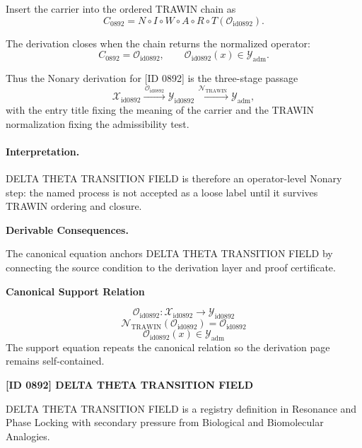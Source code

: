Insert the carrier into the ordered TRAWIN chain as\[
C_{0892}=N\circ I\circ W\circ A\circ R\circ T(\mathcal{O}_{\mathrm{id0892}}).
\]

The derivation closes when the chain returns the normalized operator:\[
C_{0892}=\mathcal{O}_{\mathrm{id0892}},\qquad \mathcal{O}_{\mathrm{id0892}}(x)\in\mathcal{Y}_{\mathrm{adm}}.
\]

Thus the Nonary derivation for [ID 0892] is the three-stage passage
\[
\mathcal{X}_{\mathrm{id0892}}\xrightarrow{\,\mathcal{O}_{\mathrm{id0892}}\,} \mathcal{Y}_{\mathrm{id0892}}\xrightarrow{\,\mathcal{N}_{\mathrm{TRAWIN}}\,} \mathcal{Y}_{\mathrm{adm}},
\]
with the entry title fixing the meaning of the carrier and the TRAWIN normalization fixing the admissibility test.

\paragraph{Interpretation.} DELTA THETA TRANSITION FIELD is therefore an operator-level Nonary step: the named process is not accepted as a loose label until it survives TRAWIN ordering and closure.

\par\vspace{0.35em}
\noindent\textbf{Derivable Consequences.}\quad
\begingroup
\footnotesize
\raggedright
The canonical equation anchors DELTA THETA TRANSITION FIELD by connecting the source condition to the derivation layer and proof certificate.
\par\endgroup

\noindent\textbf{Canonical Support Relation}\par
\[
\mathcal{O}_{\mathrm{id0892}}:\mathcal{X}_{\mathrm{id0892}}\longrightarrow\mathcal{Y}_{\mathrm{id0892}}
\]
\[
\mathcal{N}_{\mathrm{TRAWIN}}(\mathcal{O}_{\mathrm{id0892}})=\mathcal{O}_{\mathrm{id0892}}
\]
\[
\mathcal{O}_{\mathrm{id0892}}(x)\in\mathcal{Y}_{\mathrm{adm}}
\]
\noindent The support equation repeats the canonical relation so the derivation page remains self-contained.\par

\clearpage
\noindent\textbf{[ID 0892] DELTA THETA TRANSITION FIELD}\par
\vspace{0.35em}
\begingroup\small
{}
DELTA THETA TRANSITION FIELD is a registry definition in Resonance and Phase Locking with secondary pressure from Biological and Biomolecular Analogies.

